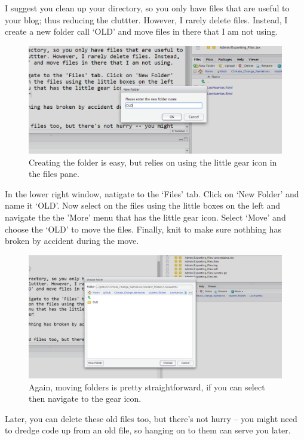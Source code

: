 \documentclass{article}\usepackage[]{graphicx}\usepackage[]{color}
\begin{document}
I suggest you clean up your directory, so you only have files that are useful to your blog; thus reducing the cluttter. However, I rarely delete files. Instead, I create a new folder call `OLD' and move files in there that I am not using.

\begin{figure}
\includegraphics[width=\textwidth]{CreateFolder}
\caption{Creating the folder is easy, but relies on using the little gear icon in the files pane.}
\end{figure}

In the lower right window, natigate to the `Files' tab. Click on `New Folder' and name it `OLD'. Now select on the files using the little boxes on the left and navigate the the 'More' menu that has the little gear icon. Select `Move' and choose the `OLD' to move the files. Finally, knit to make sure nothhing has broken by accident during the move. 

\begin{figure}
\includegraphics[width=\textwidth]{MoveFiles}
\caption{Again, moving folders is pretty straightforward, if you can select then navigate to the gear icon.}
\end{figure}

Later, you can delete these old files too, but there's not hurry -- you might need to dredge code up from an old file, so hanging on to them can serve you later. 
\end{document}
